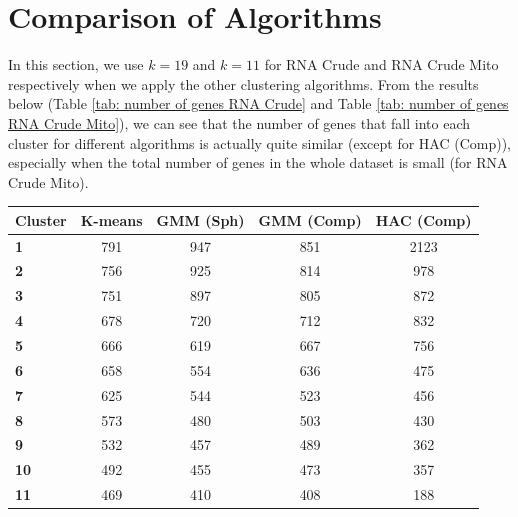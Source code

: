 \section{Comparison of Algorithms} \label{5.2}
In this section, we use $k=19$ and $k=11$ for RNA Crude and RNA Crude Mito respectively when we apply the other clustering algorithms. From the results below (Table \ref{tab: number of genes RNA Crude} and Table \ref{tab: number of genes RNA Crude Mito}), we can see that the number of genes that fall into each cluster for different algorithms is actually quite similar (except for HAC (Comp)), especially when the total number of genes in the whole dataset is small (for RNA Crude Mito).
\begin{table}[H]
	\centering
	\begin{tabular}{lcccc}
		\hline
		\textbf{Cluster} & \textbf{K-means} & \textbf{GMM (Sph)} & \textbf{GMM (Comp)} & \textbf{HAC (Comp)} \\ \hline
		\textbf{1}       & 791              & 947                & 851                 & 2123                \\ \hline
		\textbf{2}       & 756              & 925                & 814                 & 978               \\ \hline
		\textbf{3}       & 751              & 897                & 805                 & 872                 \\ \hline
		\textbf{4}       & 678              & 720                & 712                 & 832                 \\ \hline
		\textbf{5}       & 666              & 619                & 667                 & 756                 \\ \hline
		\textbf{6}       & 658              & 554                & 636                 & 475                 \\ \hline
		\textbf{7}       & 625              & 544                & 523                 & 456                 \\ \hline
		\textbf{8}       & 573              & 480                & 503                 & 430                 \\ \hline
		\textbf{9}       & 532              & 457                & 489                 & 362                 \\ \hline
		\textbf{10}      & 492              & 455                & 473                 & 357                 \\ \hline
		\textbf{11}      & 469              & 410                & 408                 & 188                 \\ \hline

\end{tabular}
\end{table}
